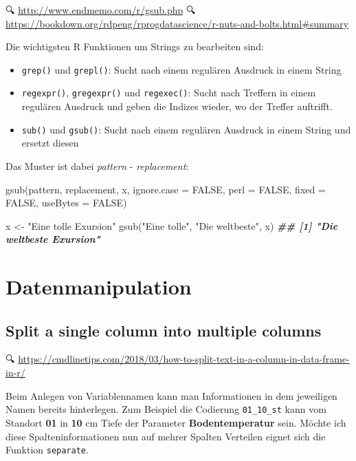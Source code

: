 \documentclass[
]{article}
\newenvironment{Shaded}{\begin{snugshade}}{\end{snugshade}}
\newcommand{\DocumentationTok}[1]{\textcolor[rgb]{0.56,0.35,0.01}{\textbf{\textit{#1}}}}
\newcommand{\FunctionTok}[1]{\textcolor[rgb]{0.00,0.00,0.00}{#1}}
\newcommand{\NormalTok}[1]{#1}
\newcommand{\OtherTok}[1]{\textcolor[rgb]{0.56,0.35,0.01}{#1}}
\newcommand{\StringTok}[1]{\textcolor[rgb]{0.31,0.60,0.02}{#1}}
\providecommand{\tightlist}{%
  \setlength{\itemsep}{0pt}\setlength{\parskip}{0pt}}
\begin{document}
🔍 \url{http://www.endmemo.com/r/gsub.php}
🔍 \url{https://bookdown.org/rdpeng/rprogdatascience/r-nuts-and-bolts.html\#summary}

Die wichtigsten R Funktionen um Strings zu bearbeiten sind:

\begin{itemize}
\tightlist
\item
  \texttt{grep()} und \texttt{grepl()}: Sucht nach einem regulären Ausdruck in einem String
\item
  \texttt{regexpr()}, \texttt{gregexpr()} und \texttt{regexec()}: Sucht nach Treffern in einem regulären Ausdruck und geben die Indizes wieder, wo der Treffer auftrifft.
\item
  \texttt{sub()} und \texttt{gsub()}: Sucht nach einem regulären Ausdruck in einem String und ersetzt diesen
\end{itemize}

Das Muster ist dabei \emph{pattern} - \emph{replacement}:

gsub(pattern, replacement, x, ignore.case = FALSE, perl = FALSE, fixed = FALSE, useBytes = FALSE)

\begin{Shaded}
\begin{Highlighting}[]
\NormalTok{x }\OtherTok{\textless{}{-}} \StringTok{"Eine tolle Exursion"}
\FunctionTok{gsub}\NormalTok{(}\StringTok{"Eine tolle"}\NormalTok{, }\StringTok{"Die weltbeste"}\NormalTok{, x)}
\DocumentationTok{\#\# [1] "Die weltbeste Exursion"}
\end{Highlighting}
\end{Shaded}

\hypertarget{datenmanipulation}{%
\section{Datenmanipulation}\label{datenmanipulation}}

\hypertarget{split-a-single-column-into-multiple-columns}{%
\subsection{Split a single column into multiple columns}\label{split-a-single-column-into-multiple-columns}}

🔍 \url{https://cmdlinetips.com/2018/03/how-to-split-text-in-a-column-in-data-frame-in-r/}

Beim Anlegen von Variablennamen kann man Informationen in dem jeweiligen Namen bereits hinterlegen. Zum Beispiel die Codierung \texttt{01\_10\_st} kann vom Standort \textbf{01} in \textbf{10} cm Tiefe der Parameter \textbf{Bodentemperatur} sein. Möchte ich diese Spalteninformationen nun auf mehrer Spalten Verteilen eignet sich die Funktion \texttt{separate}.
\end{document}
